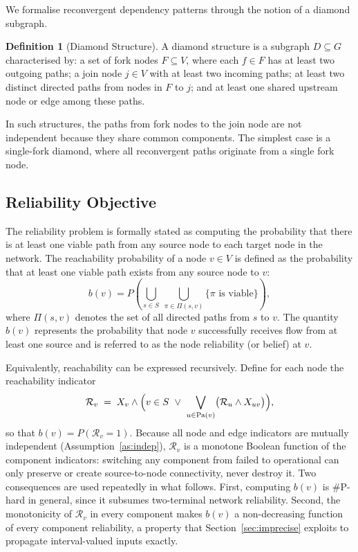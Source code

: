 \documentclass[preprint,12pt]{elsarticle}
\theoremstyle{definition}
\newtheorem{definition}{Definition}
\begin{document}
We formalise reconvergent dependency patterns through the notion of a diamond subgraph.

\begin{definition}[Diamond Structure]
A diamond structure is a subgraph $D\subseteq G$ characterised by:
a set of fork nodes $F\subseteq V$, where each $f\in F$ has at least two outgoing paths;
a join node $j\in V$ with at least two incoming paths;
at least two distinct directed paths from nodes in $F$ to $j$;
and at least one shared upstream node or edge among these paths.
\end{definition}

In such structures, the paths from fork nodes to the join node are not independent because they share
common components. The simplest case is a single-fork diamond, where all reconvergent paths originate
from a single fork node.

\subsection{Reliability Objective}\label{sec:objective}

The reliability problem is formally stated as computing the probability that there is at least one viable
path from any source node to each target node in the network. The reachability probability of a node
$v\in V$ is defined as the probability that at least one viable path exists from any source node to $v$:
\begin{equation}
b(v)=P\!\left(\bigcup_{s\in S}\ \bigcup_{\pi\in\Pi(s,v)}\{\pi \text{ is viable}\}\right),
\end{equation}
where $\Pi(s,v)$ denotes the set of all directed paths from $s$ to $v$. The quantity $b(v)$ represents
the probability that node $v$ successfully receives flow from at least one source and is referred to as
the node reliability (or belief) at $v$.

Equivalently, reachability can be expressed recursively. Define for each node the reachability indicator
\begin{equation}\label{eq:reach_indicator}
\mathcal{R}_v \;=\; X_v \wedge \Bigl( v\in S \ \vee\ \bigvee_{u\in \mathrm{Pa}(v)}
\bigl( \mathcal{R}_u \wedge X_{uv} \bigr) \Bigr),
\end{equation}
so that $b(v)=P(\mathcal{R}_v=1)$. Because all node and edge indicators are mutually independent
(Assumption~\ref{as:indep}), $\mathcal{R}_v$ is a monotone Boolean function of the component indicators:
switching any component from failed to operational can only preserve or create source-to-node
connectivity, never destroy it. Two consequences are used repeatedly in what follows. First, computing
$b(v)$ is \#P-hard in general, since it subsumes two-terminal network reliability. Second, the
monotonicity of $\mathcal{R}_v$ in every component makes $b(v)$ a non-decreasing function of every
component reliability, a property that Section~\ref{sec:imprecise} exploits to propagate interval-valued
inputs exactly.
\end{document}
